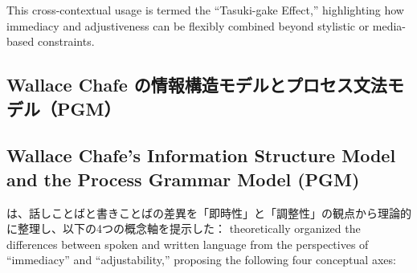 This cross-contextual usage is termed the ``Tasuki-gake Effect,'' highlighting how immediacy and adjustiveness can be flexibly combined beyond stylistic or media-based constraints.
\fi

\ifJPN
\subsection{Wallace Chafe の情報構造モデルとプロセス文法モデル（PGM）}
\else
\subsection{Wallace Chafe's Information Structure Model and the Process Grammar Model (PGM)}
\fi

\ifJPN
\textcite{chafe1982integration}は、話しことばと書きことばの差異を「即時性」と「調整性」の観点から理論的に整理し、以下の4つの概念軸を提示した：
\else
\textcite{chafe1982integration} theoretically organized the differences between spoken and written language from the perspectives of ``immediacy'' and ``adjustability,'' proposing the following four conceptual axes:
\fi


